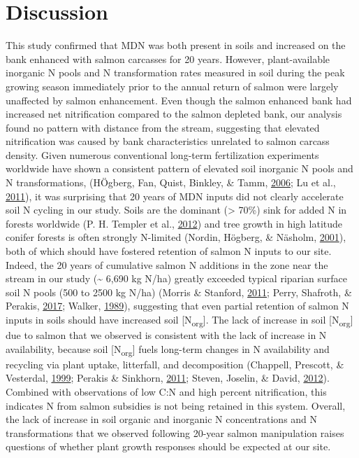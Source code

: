\documentclass [11pt, proquest] {uwthesis}[2015/03/03]
\begin{document}
\section{Discussion}\label{discussion}

This study confirmed that MDN was both present in soils and increased on
the bank enhanced with salmon carcasses for 20 years. However,
plant-available inorganic N pools and N transformation rates measured in
soil during the peak growing season immediately prior to the annual
return of salmon were largely unaffected by salmon enhancement. Even
though the salmon enhanced bank had increased net nitrification compared
to the salmon depleted bank, our analysis found no pattern with distance
from the stream, suggesting that elevated nitrification was caused by
bank characteristics unrelated to salmon carcass density. Given numerous
conventional long-term fertilization experiments worldwide have shown a
consistent pattern of elevated soil inorganic N pools and N
transformations, (HÖgberg, Fan, Quist, Binkley, \& Tamm,
\protect\hyperlink{ref-Hogberg2006}{2006}; Lu et al.,
\protect\hyperlink{ref-Lu2011}{2011}), it was surprising that 20 years
of MDN inputs did not clearly accelerate soil N cycling in our study.
Soils are the dominant (\textgreater{} 70\%) sink for added N in forests
worldwide (P. H. Templer et al.,
\protect\hyperlink{ref-Templer2012}{2012}) and tree growth in high
latitude conifer forests is often strongly N-limited (Nordin, Högberg,
\& Näsholm, \protect\hyperlink{ref-Nordin2001}{2001}), both of which
should have fostered retention of salmon N inputs to our site. Indeed,
the 20 years of cumulative salmon N additions in the zone near the
stream in our study (\textasciitilde{} 6,690 kg N/ha) greatly exceeded
typical riparian surface soil N pools (500 to 2500 kg N/ha) (Morris \&
Stanford, \protect\hyperlink{ref-Morris2011}{2011}; Perry, Shafroth, \&
Perakis, \protect\hyperlink{ref-Perry2017}{2017}; Walker,
\protect\hyperlink{ref-Walker1989}{1989}), suggesting that even partial
retention of salmon N inputs in soils should have increased soil
{[}N\textsubscript{org}{]}. The lack of increase in soil
{[}N\textsubscript{org}{]} due to salmon that we observed is consistent
with the lack of increase in N availability, because soil
{[}N\textsubscript{org}{]} fuels long-term changes in N availability and
recycling via plant uptake, litterfall, and decomposition (Chappell,
Prescott, \& Vesterdal, \protect\hyperlink{ref-Chapell1999}{1999};
Perakis \& Sinkhorn, \protect\hyperlink{ref-Perakis2011}{2011}; Steven,
Joselin, \& David, \protect\hyperlink{ref-Perakis2012}{2012}). Combined
with observations of low C:N and high percent nitrification, this
indicates N from salmon subsidies is not being retained in this system.
Overall, the lack of increase in soil organic and inorganic N
concentrations and N transformations that we observed following 20-year
salmon manipulation raises questions of whether plant growth responses
should be expected at our site.
\end{document}
